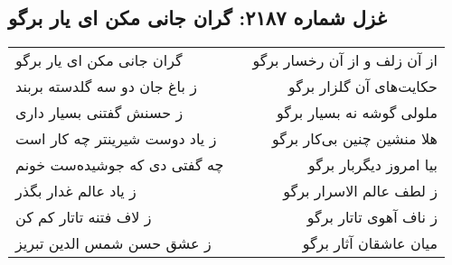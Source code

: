 \begin{center}
\section*{غزل شماره ۲۱۸۷: گران جانی مکن ای یار برگو}
\label{sec:2187}
\begin{longtable}{l p{0.5cm} r}
گران جانی مکن ای یار برگو
&&
از آن زلف و از آن رخسار برگو
\\
ز باغ جان دو سه گلدسته بربند
&&
حکایت‌های آن گلزار برگو
\\
ز حسنش گفتنی بسیار داری
&&
ملولی گوشه نه بسیار برگو
\\
ز یاد دوست شیرینتر چه کار است
&&
هلا منشین چنین بی‌کار برگو
\\
چه گفتی دی که جوشیده‌ست خونم
&&
بیا امروز دیگربار برگو
\\
ز یاد عالم غدار بگذر
&&
ز لطف عالم الاسرار برگو
\\
ز لاف فتنه تاتار کم کن
&&
ز ناف آهوی تاتار برگو
\\
ز عشق حسن شمس الدین تبریز
&&
میان عاشقان آثار برگو
\\
\end{longtable}
\end{center}
